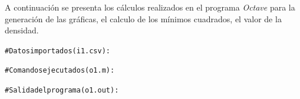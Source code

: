 \documentclass[letter,11pt]{article}
\begin{document}
A continuación se presenta los cálculos realizados en el programa \emph{Octave}
para la generación de las gráficas, el calculo de los mínimos cuadrados, el
valor de la densidad.

\begin{shaded}
\begin{alltt}
\footnotesize
\# Datos importados (i1.csv):


\# Comandos ejecutados (o1.m):




\# Salida del programa (o1.out):

\normalsize
\end{alltt}
\end{shaded}
\end{document}
